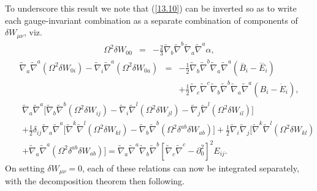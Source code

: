 To underscore this result we note that (\ref{13.10}) can be inverted so as to write each gauge-invariant combination as a separate combination of components of $\delta W_{\mu\nu}$, viz.
%
\begin{eqnarray}
\Omega^{2}\delta W_{00} &=&- \tfrac{2}{3} \tilde{\nabla}_{b}\tilde{\nabla}^{b}\tilde{\nabla}_{a}\tilde{\nabla}^{a}\alpha,
\label{13.13}
\end{eqnarray}
%
%
\begin{eqnarray}
\tilde\nabla_a\tilde\nabla^a(\Omega^2 \delta W_{0i}) - \tilde\nabla_i \tilde\nabla^a(\Omega^2  \delta W_{0a})&=&- \tfrac{1}{2} \tilde{\nabla}_{b}\tilde{\nabla}^{b}\tilde{\nabla}_{a}\tilde{\nabla}^{a}(\overset{..}{B}_{i}-\overset{...}{E}_{i})
\\
&& + \tfrac{1}{2} \tilde{\nabla}_{c}\tilde{\nabla}^{c}\tilde{\nabla}_{b}\tilde{\nabla}^{b}\tilde{\nabla}_{a}\tilde{\nabla}^{a}(B_{i} -\dot{E}_{i}),
\nonumber
\label{13.14}
\end{eqnarray}
%
%
\begin{eqnarray}
&&\tilde\nabla_a \tilde\nabla^a \big[ \tilde\nabla_b \tilde\nabla^b (\Omega^2 \delta W_{ij})- \tilde\nabla_i \tilde\nabla^l(\Omega^2  \delta W_{jl}) -  \tilde\nabla_j \tilde\nabla^l(\Omega^2  \delta W_{il})\big]
\nonumber\\
&&+\tfrac{1}{2}\delta_{ij}\tilde\nabla_a \tilde\nabla^a\big[  \tilde\nabla^k \tilde\nabla^l(\Omega^2  \delta W_{kl})-\tilde\nabla_b \tilde\nabla^b(\Omega^2\delta^{ab}\delta W_{ab})\big]
+\tfrac{1}{2} \tilde\nabla_i\tilde\nabla_j \big[ \tilde\nabla^k \tilde\nabla^l(\Omega^2  \delta W_{kl})
\nonumber\\
&& + \tilde\nabla_a \tilde\nabla^a(\Omega^2 \delta^{ab}\delta W_{ab})\big] 
=\tilde\nabla_a \tilde\nabla^a \tilde\nabla_b \tilde\nabla^b\left[\tilde\nabla_c \tilde\nabla^c - \partial_0^2\right]^2E_{ij}.
\label{13.15}
\end{eqnarray}
%
On setting $\delta W_{\mu\nu}=0$, each of these relations can now be integrated separately, with the decomposition theorem then following. 

